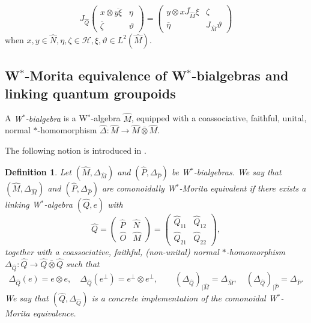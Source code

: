 \documentclass[reqno]{amsart}
\numberwithin{equation}{section}
\newtheorem{Def}[Theorem]{Definition}
\newcommand{\Hsp}{\mathcal{H}}
\begin{document}
\begin{equation}\label{EqMoritaModCon}
J_{\hat{Q}}\begin{pmatrix} x\otimes \overline{y\xi} & \eta \\ \overline{\zeta} & \vartheta\end{pmatrix} = \begin{pmatrix} y\otimes \overline{xJ_{\hat{M}}\xi} & \zeta \\ \overline{\eta} & J_{\hat{M}}\vartheta\end{pmatrix}
\end{equation}
when $x,y\in\hat{N}, \eta,\zeta\in \Hsp, \xi,\vartheta\in L^2(\hat{M})$.



\subsection{W\texorpdfstring{$^*$}{*}-Morita equivalence of W\texorpdfstring{$^*$}{*}-bialgebras and linking quantum groupoids}

A \emph{W$^*$-bialgebra} is a W$^*$-algebra $\hat{M}$, equipped with a coassociative, faithful, unital, normal $*$-homomorphism $\hat{\Delta}\colon \hat{M} \rightarrow \hat{M}\bar{\otimes}\hat{M}$.

The following notion is introduced in \cite{DC11a}. 

\begin{Def}\label{def2}
Let $(\hat{M},\Delta_{\hat{M}})$ and $(\hat{P},\Delta_{\hat{P}})$ be W$^*$-bialgebras. We say that $(\hat{M},\Delta_{\hat{M}})$ and $(\hat{P},\Delta_{\hat{P}})$ are \emph{comonoidally W$^*$-Morita equivalent} if there exists a linking W$^*$-algebra $(\hat{Q},e)$ with 
\[
\hat{Q} = \begin{pmatrix} \hat{P} & \hat{N} \\ \hat{O} & \hat{M}\end{pmatrix} = \begin{pmatrix} \hat{Q}_{11} & \hat{Q}_{12} \\ \hat{Q}_{21} & \hat{Q}_{22}\end{pmatrix},
\] 
together with a coassociative, faithful, (non-unital) normal $*$-homomorphism $\Delta_{\hat{Q}}\colon \hat{Q} \rightarrow \hat{Q}\bar{\otimes}\hat{Q}$ such that 
\[
\Delta_{\hat{Q}}(e) = e\otimes e,\quad \Delta_{\hat{Q}}(e^{\perp}) = e^{\perp}\otimes e^{\perp},\qquad (\Delta_{\hat{Q}})_{\mid \hat{M}} = \Delta_{\hat{M}},\quad (\Delta_{\hat{Q}})_{\mid \hat{P}} = \Delta_{\hat{P}}. 
\]
We say that $(\hat{Q},\Delta_{\hat{Q}})$ is a concrete implementation of the comonoidal W$^*$-Morita equivalence.
\end{Def}
\end{document}

